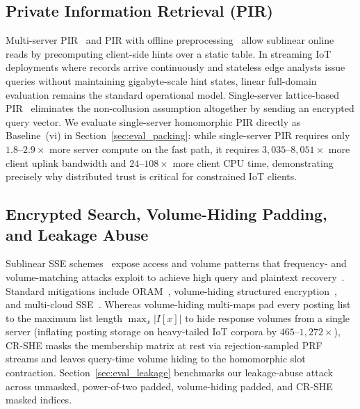 \documentclass[11pt,a4paper]{article}
\begin{document}
\subsection{Private Information Retrieval (PIR)}
Multi-server PIR~\cite{chor1998} and PIR with offline preprocessing~\cite{beimel2000,corrigan2020,corrigan2022,zhou2024} allow sublinear online reads by precomputing client-side hints over a static table. In streaming IoT deployments where records arrive continuously and stateless edge analysts issue queries without maintaining gigabyte-scale hint states, linear full-domain evaluation remains the standard operational model. Single-server lattice-based PIR~\cite{kushilevitz1997,angel2018,mughees2021,menon2022,davidson2023} eliminates the non-collusion assumption altogether by sending an encrypted query vector. We evaluate single-server homomorphic PIR directly as Baseline~(vi) in Section~\ref{sec:eval_packing}: while single-server PIR requires only $1.8\text{--}2.9\times$ more server compute on the fast path, it requires $3{,}035\text{--}8{,}051\times$ more client uplink bandwidth and $24\text{--}108\times$ more client CPU time, demonstrating precisely why distributed trust is critical for constrained IoT clients.

\subsection{Encrypted Search, Volume-Hiding Padding, and Leakage Abuse}
Sublinear SSE schemes~\cite{song2000,curtmola2006} expose access and volume patterns that frequency- and volume-matching attacks exploit to achieve high query and plaintext recovery~\cite{islam2012,cash2015,grubbs2017}. Standard mitigations include ORAM~\cite{goldreich1996}, volume-hiding structured encryption~\cite{kamara2019,patel2019}, and multi-cloud SSE~\cite{xu2021,xu2023,zhang2024,yang2023,du2022}. Whereas volume-hiding multi-maps pad every posting list to the maximum list length $\max_x |I[x]|$ to hide response volumes from a single server (inflating posting storage on heavy-tailed IoT corpora by $465\text{--}1{,}272\times$), CR-SHE masks the membership matrix at rest via rejection-sampled PRF streams and leaves query-time volume hiding to the homomorphic slot contraction. Section~\ref{sec:eval_leakage} benchmarks our leakage-abuse attack across unmasked, power-of-two padded, volume-hiding padded, and CR-SHE masked indices.
\end{document}
